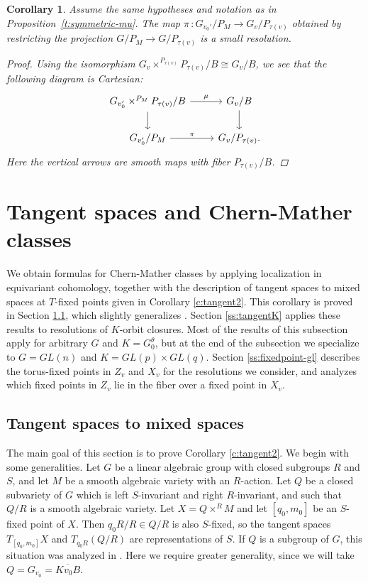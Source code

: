 \documentclass[11pt,letterpaper,reqno]{amsart}
\numberwithin{equation}{section}
\theoremstyle{plain}
\newtheorem{corollary}[theorem]{Corollary}
\theoremstyle{definition}
\theoremstyle{remark}
\begin{document}
\begin{corollary}\label{corollary: symmetric mu}
Assume the same hypotheses and notation as in Proposition~\ref{t:symmetric-mu}.
The map \(\pi\,\colon G_{v_0'} /P_M\to G_v/P_{\tau(v)}\) obtained by restricting the projection \(G/P_M\to G/P_{\tau(v)}\) is a small resolution.
\begin{proof}
Using the isomorphism $G_v \times^{P_{\tau(v)}} P_{\tau(v)}/B \cong G_v/B$, we see
that the following diagram is Cartesian:
\begin{equation}
\begin{tikzcd}
G_{v_0'} \times^{P_M} P_{\tau(v)}/B\arrow[r,"\mu"]\arrow[d]& G_v/B\arrow[d]\\
G_{v_0'} /P_M\arrow[r,"\pi"]&G_v /P_{\tau(v)}.
\end{tikzcd}
\end{equation}
Here the vertical arrows are smooth maps with fiber \(P_{\tau(v)}/B\).
\end{proof}
\end{corollary}


\section{Tangent spaces and Chern-Mather classes} \label{s:tangent}
We obtain formulas for Chern-Mather classes by applying
localization in equivariant cohomology, together with
the description of tangent spaces to
mixed spaces at $T$-fixed points given in
Corollary \ref{c:tangent2}.  This corollary is proved in
Section \ref{ss:mixed},
which slightly generalizes 
\cite[Section 3]{GZ}.  Section \ref{ss:tangentK} applies these
results to resolutions of $K$-orbit closures.  Most of the results of this subsection apply for arbitrary
$G$ and $K = G^{\theta}_0$, but at the end of the subsection we specialize to $G = GL(n)$ and $K = GL(p) \times GL(q)$.
Section \ref{ss:fixedpoint-gl} describes the torus-fixed points in 
$Z_v$ and $X_v$ for the resolutions we consider, and analyzes
which fixed points in $Z_v$ lie in the fiber over a fixed point in $X_v$.




\subsection{Tangent spaces to mixed spaces} \label{ss:mixed}
The main goal of this section is to prove Corollary \ref{c:tangent2}.  We begin with some generalities.
Let $G$ be a linear algebraic group with closed subgroups $R$ and $S$, and let $M$ be a smooth algebraic variety with
an $R$-action.  Let $Q$ be a closed subvariety of $G$ which is left $S$-invariant and right $R$-invariant, and such that $Q/R$ is a smooth algebraic variety.
Let $X = Q \times^R M$ and let $[q_0, m_0]$ be an $S$-fixed point of $X$.
Then $q_0 R/R \in Q/R$ is also $S$-fixed, so the tangent spaces $T_{[q_0, m_0]} X$ and $T_{q_0 R} (Q/R)$ are representations of $S$.  If $Q$ is a subgroup of $G$,
this situation was analyzed in \cite[Section 3]{GZ}.  Here we require greater generality, since we will take
$Q = G_{v_0} = \overline{K v_0 B}$.
\end{document}
